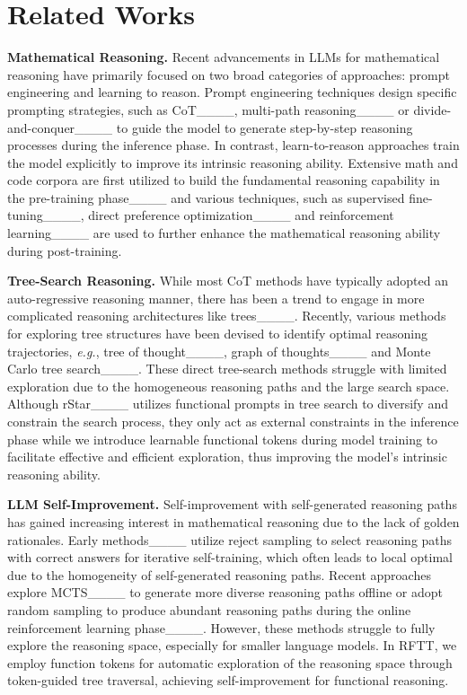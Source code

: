 \section{Related Works}
\textbf{Mathematical Reasoning.}
Recent advancements in LLMs for mathematical reasoning have primarily focused on two broad categories of approaches: prompt engineering and learning to reason. Prompt engineering techniques design specific prompting strategies, such as CoT____, multi-path reasoning____ or divide-and-conquer____ to guide the model to generate step-by-step reasoning processes during the inference phase. In contrast, learn-to-reason approaches train the model explicitly to improve its intrinsic reasoning ability. Extensive math and code corpora are first utilized to build the fundamental reasoning capability in the pre-training phase____ and various techniques, such as supervised fine-tuning____, direct preference optimization____ and reinforcement learning____ are used to further enhance the mathematical reasoning ability during post-training.


\textbf{Tree-Search Reasoning.}
While most CoT methods have typically adopted an auto-regressive reasoning manner, there has been a trend to engage in more complicated reasoning architectures like trees____. Recently, various methods for exploring tree structures have been devised to identify optimal reasoning trajectories, \textit{e.g.},  tree of thought____, graph of thoughts____ and Monte Carlo tree search____. These direct tree-search methods struggle with limited exploration due to the homogeneous reasoning paths and the large search space. Although rStar____ utilizes functional prompts in tree search to diversify and constrain the search process, they only act as external constraints in the inference phase while we introduce learnable functional tokens during model training to facilitate effective and efficient exploration, thus improving the model's intrinsic reasoning ability.

\textbf{LLM Self-Improvement.}
Self-improvement with self-generated reasoning paths has gained increasing interest in mathematical reasoning due to the lack of golden rationales. Early methods____ utilize reject sampling to select reasoning paths with correct answers for iterative self-training, which often leads to local optimal due to the homogeneity of self-generated reasoning paths. Recent approaches explore MCTS____ to generate more diverse reasoning paths offline or adopt random sampling to produce abundant reasoning paths during the online reinforcement learning phase____. However, these methods struggle to fully explore the reasoning space, especially for smaller language models. In RFTT, we employ function tokens for automatic exploration of the reasoning space through token-guided tree traversal, achieving self-improvement for functional reasoning.


